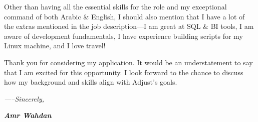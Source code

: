 \documentclass[12pt]{article}
\newcommand{\fancy}[1]{\Large\textbf{\textit{#1}}}
\begin{document}
Other than having all the essential skills for the role and my exceptional command of both Arabic \& English, I should also mention that I have a lot of the extras mentioned in the job description---I am great at SQL \& BI tools, I am aware of development fundamentals, I have experience building scripts for my Linux machine, and I love travel!
\vspace{1em}

Thank you for considering my application. It would be an understatement to say that I am excited for this opportunity. I look forward to the chance to discuss how my background and skills align with Adjust's goals.


\vspace{1.5em}

\textit{-----Sincerely,}

\vspace{1em}

\fancy{Amr Wahdan}
\end{document}
